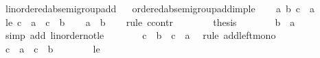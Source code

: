\begin{isabellebody}
\isanewline
\isanewline
{}\isamarkupfalse%
\ linordered{\isacharunderscore}{\kern0pt}ab{\isacharunderscore}{\kern0pt}semigroup{\isacharunderscore}{\kern0pt}add%
\isadelimproof
\ %
\endisadelimproof
%
\isatagproof
\isacommand{{\isachardot}{\kern0pt}{\isachardot}{\kern0pt}}\isamarkupfalse%
%
\endisatagproof
{\isafoldproof}%
%
\isadelimproof
%
\endisadelimproof
\isanewline
\isanewline
{}\isamarkupfalse%
\ ordered{\isacharunderscore}{\kern0pt}ab{\isacharunderscore}{\kern0pt}semigroup{\isacharunderscore}{\kern0pt}add{\isacharunderscore}{\kern0pt}imp{\isacharunderscore}{\kern0pt}le\isanewline
%
\isadelimproof
%
\endisadelimproof
%
\isatagproof
{}\isamarkupfalse%
\isanewline
\ \ \isamarkupfalse%
\ a\ b\ c\ {\isacharcolon}{\kern0pt}{\isacharcolon}{\kern0pt}\ {\isacharprime}{\kern0pt}a\isanewline
\ \ \isamarkupfalse%
\ le{}{\isacharcolon}{\kern0pt}\ {\isachardoublequoteopen}c\ {\isacharplus}{\kern0pt}\ a\ {\isasymle}\ c\ {\isacharplus}{\kern0pt}\ b{\isachardoublequoteclose}\isanewline
\ \ \isamarkupfalse%
\ {\isachardoublequoteopen}a\ {\isasymle}\ b{\isachardoublequoteclose}\isanewline
\ \ \isamarkupfalse%
\ {\isacharparenleft}{\kern0pt}rule\ ccontr{\isacharparenright}{\kern0pt}\isanewline
\ \ \ \ \isamarkupfalse%
\ {\isacharasterisk}{\kern0pt}{\isacharcolon}{\kern0pt}\ {\isachardoublequoteopen}{\isasymnot}\ {\isacharquery}{\kern0pt}thesis{\isachardoublequoteclose}\isanewline
\ \ \ \ \isamarkupfalse%
\ \isamarkupfalse%
\ {\isachardoublequoteopen}b\ {\isasymle}\ a{\isachardoublequoteclose}\ \isamarkupfalse%
\ {\isacharparenleft}{\kern0pt}simp\ add{\isacharcolon}{\kern0pt}\ linorder{\isacharunderscore}{\kern0pt}not{\isacharunderscore}{\kern0pt}le{\isacharparenright}{\kern0pt}\isanewline
\ \ \ \ \isamarkupfalse%
\ \isamarkupfalse%
\ {\isachardoublequoteopen}c\ {\isacharplus}{\kern0pt}\ b\ {\isasymle}\ c\ {\isacharplus}{\kern0pt}\ a{\isachardoublequoteclose}\ \isamarkupfalse%
\ {\isacharparenleft}{\kern0pt}rule\ add{\isacharunderscore}{\kern0pt}left{\isacharunderscore}{\kern0pt}mono{\isacharparenright}{\kern0pt}\isanewline
\ \ \ \ \isamarkupfalse%
\ \isamarkupfalse%
\ {\isachardoublequoteopen}c\ {\isacharplus}{\kern0pt}\ a\ {\isacharequal}{\kern0pt}\ c\ {\isacharplus}{\kern0pt}\ b{\isachardoublequoteclose}\isanewline
\ \ \ \ \ \ \isamarkupfalse%
\ le{}\ \isamarkupfalse%

\end{isabellebody}
